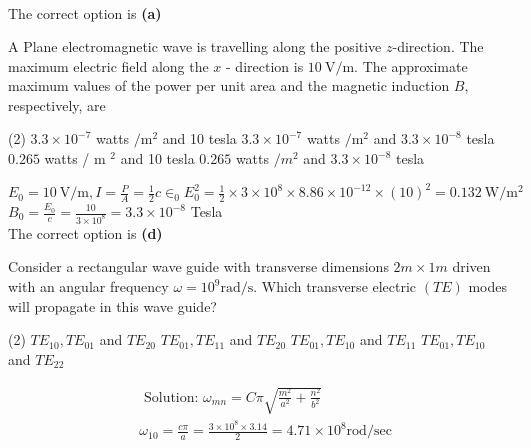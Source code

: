 \begin{enumerate}
\begin{answer}
$$\begin{aligned}
	\end{aligned}$$	
	The correct option is \textbf{(a)}
\end{answer}
\begin{minipage}{\textwidth}
	\item A Plane electromagnetic wave is travelling along the positive $z$-direction. The maximum electric field along the $x$ - direction is $10 \mathrm{~V} / \mathrm{m}$. The approximate maximum values of the power per unit area and the magnetic induction $B$, respectively, are
\end{minipage}
\begin{tasks}(2)
	\task[\textbf{A.}] $3.3 \times 10^{-7}$ watts $/ \mathrm{m}^{2}$ and 10 tesla
	\task[\textbf{B.}]$3.3 \times 10^{-7}$ watts $/ \mathrm{m}^{2}$ and $3.3 \times 10^{-8}$ tesla
	\task[\textbf{C.}]$0.265$ watts / m $^{2}$ and 10 tesla
	\task[\textbf{D.}]$0.265$ watts $/ m^{2}$ and $3.3 \times 10^{-8}$ tesla	
\end{tasks}
\begin{answer}
	$E_{0}=10 \mathrm{~V} / \mathrm{m}, I=\frac{P}{A}=\frac{1}{2} c \in_{0} E_{0}^{2}=\frac{1}{2} \times 3 \times 10^{8} \times 8.86 \times 10^{-12} \times(10)^{2}=0.132 \mathrm{~W} / \mathrm{m}^{2}$
	$B_{0}=\frac{E_{0}}{c}=\frac{10}{3 \times 10^{8}}=3.3 \times 10^{-8}$ Tesla	\\
	The correct option is \textbf{(d)}
\end{answer}
\begin{minipage}{\textwidth}
	\item Consider a rectangular wave guide with transverse dimensions $2 m \times 1 m$ driven with an angular frequency $\omega=10^{9} \mathrm{rad} / \mathrm{s}$. Which transverse electric $(T E)$ modes will propagate in this wave guide?
\end{minipage}
\begin{tasks}(2)
	\task[\textbf{A.}] $T E_{10}, T E_{01}$ and $T E_{20}$
	\task[\textbf{B.}]$T E_{01}, T E_{11}$ and $T E_{20}$
	\task[\textbf{C.}]$T E_{01}, T E_{10}$ and $T E_{11}$
	\task[\textbf{D.}]$T E_{01}, T E_{10}$ and $T E_{22}$
\end{tasks}
\begin{answer}
	$$
	\begin{aligned}
	&\text { Solution: } \omega_{m n}=C \pi \sqrt{\frac{m^{2}}{a^{2}}+\frac{n^{2}}{b^{2}}} \\
	&\omega_{10}=\frac{c \pi}{a}=\frac{3 \times 10^{8} \times 3.14}{2}=4.71 \times 10^{8} \mathrm{rod} / \mathrm{sec} \\

\end{aligned}$$
\end{answer}
\end{enumerate}
